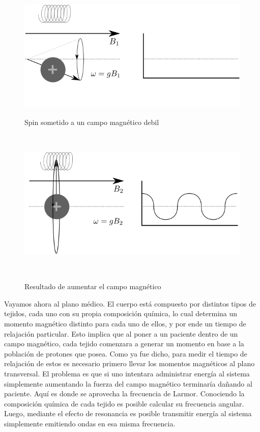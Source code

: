 \begin{figure}[h!]

\begin{minipage}[b]{0.49\textwidth}
    \includegraphics[width=\textwidth]{img/spin0.png}
    \caption{Spin sometido a un campo magn\'etico debil}
\end{minipage} ~ %
\hfill
\begin{minipage}[b]{0.49\textwidth}
    \includegraphics[width=\textwidth]{img/spin1.png}
    \caption{Resultado de aumentar el campo magn\'etico}
\end{minipage} ~ %

\end{figure}

\vspace{0.1cm}
Vayamos ahora al plano m\'edico. El cuerpo est\'a compuesto por distintos 
tipos de tejidos, cada uno con su propia composici\'on qu\'imica, lo cual 
determina un momento magn\'etico distinto para cada uno de ellos, y por ende
un tiempo de relajaci\'on particular. Esto implica que al poner a un paciente
dentro de un campo magn\'etico, cada tejido comenzara a generar un momento 
en base a la poblaci\'on de protones que posea. Como ya fue dicho, para medir
el tiempo de relajaci\'on de estos es necesario primero llevar los momentos magn\'eticos
al plano transversal. El problema es que si uno intentara administrar energ\'ia al 
sistema simplemente aumentando la fuerza del campo magn\'etico terminar\'ia da\~nando
al paciente. Aqu\'i es donde se aprovecha la frecuencia de Larmor. Conociendo la
composici\'on qu\'imica de cada tejido es posible calcular su frecuencia angular.
Luego, mediante el efecto de resonancia es posible transmitir energ\'ia al 
sistema simplemente emitiendo ondas en esa misma frecuencia. \\

